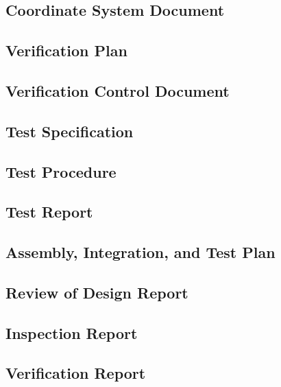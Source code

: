 \subsection{Coordinate System Document}
\label{sec:Coordinate System Document}


\subsection{Verification Plan}
\label{sec:Verification Plan}


\subsection{Verification Control Document}
\label{sec:Verification Control Document}


\subsection{Test Specification}
\label{sec:Test Specification}


\subsection{Test Procedure}
\label{sec:Test Procedure}


\subsection{Test Report}
\label{sec:Test Report}


\subsection{Assembly, Integration, and Test Plan}
\label{sec:Assembly, Integration, and Test Plan}


\subsection{Review of Design Report}
\label{sec:Review of Design Report}


\subsection{Inspection Report}
\label{sec:Inspection Report}


\subsection{Verification Report}
\label{sec:Verification Report}


